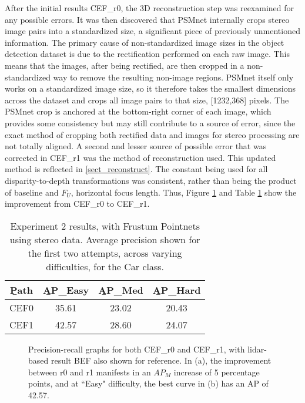 After the initial results CEF\_r0, the 3D reconstruction step was reexamined for any possible errors. It was then discovered that PSMnet internally crops stereo image pairs into a standardized size, a significant piece of previously unmentioned information. The primary cause of non-standardized image sizes in the object detection dataset is due to the rectification performed on each raw image. This means that the images, after being rectified, are then cropped in a non-standardized way to remove the resulting non-image regions. PSMnet itself only works on a standardized image size, so it therefore takes the smallest dimensions across the dataset and crops all image pairs to that size, [1232,368] pixels. The PSMnet crop is anchored at the bottom-right corner of each image, which provides some consistency but may still contribute to a source of error, since the exact method of cropping both rectified data and images for stereo processing are not totally aligned. A second and lesser source of possible error that was corrected in CEF\_r1 was the method of reconstruction used. This updated method is reflected in \ref{sect_reconstruct}. The constant being used for all disparity-to-depth transformations was consistent, rather than being the product of baseline and $F_U$, horizontal focus length. Thus, Figure \ref{fpnet_pr2} and Table \ref{fpnet_ap2} show the improvement from CEF\_r0 to CEF\_r1. 

\begin{table}[ht]
	\centering
	\caption{Experiment 2 results, with Frustum Pointnets using stereo data. Average precision shown for the first two attempts, across varying difficulties, for the Car class.}
	\begin{tabular}{|c|c|c|c|}
		\hline
		\b{Path} & \b{AP\_Easy} & \b{AP\_Med} & \b{AP\_Hard} \\ \hline
		CEF0   &    35.61     &    23.02    &    20.43     \\ \hline
		CEF1   &    42.57     &    28.60    &    24.07     \\ \hline
	\end{tabular}
	\label{fpnet_ap2}
\end{table}

\begin{figure}[H]
	\centering
	\caption{Precision-recall graphs for both CEF\_r0 and CEF\_r1, with lidar-based result BEF also shown for reference. In (a), the improvement between r0 and r1 manifests in an $AP_M$ increase of 5 percentage points, and at ``Easy" difficulty, the best curve in (b) has an AP of 42.57.}
	\label{fpnet_pr2}
\end{figure}

